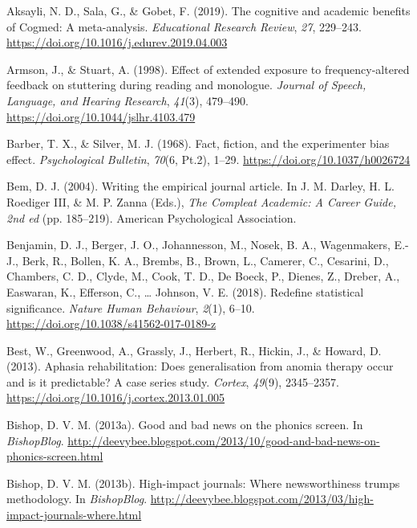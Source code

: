 \documentclass{krantz}
\newlength{\cslhangindent}
\newlength{\cslentryspacingunit} %
\newenvironment{CSLReferences}[2] %
{%
\setlength{\parindent}{0pt}
\ifodd #1
\let\oldpar\par
\def\par{\hangindent=\cslhangindent\oldpar}
\fi
\setlength{\parskip}{#2\cslentryspacingunit}
}%
{}
\begin{document}
\hypertarget{refs}{}
\begin{CSLReferences}{1}{0}
\leavevmode{}%
Aksayli, N. D., Sala, G., \& Gobet, F. (2019). The cognitive and academic benefits of {Cogmed}: {A} meta-analysis. \emph{Educational Research Review}, \emph{27}, 229--243. \url{https://doi.org/10.1016/j.edurev.2019.04.003}

\leavevmode{}%
Armson, J., \& Stuart, A. (1998). Effect of extended exposure to frequency-altered feedback on stuttering during reading and monologue. \emph{Journal of Speech, Language, and Hearing Research}, \emph{41}(3), 479--490. \url{https://doi.org/10.1044/jslhr.4103.479}

\leavevmode{}%
Barber, T. X., \& Silver, M. J. (1968). Fact, fiction, and the experimenter bias effect. \emph{Psychological Bulletin}, \emph{70}(6, Pt.2), 1--29. \url{https://doi.org/10.1037/h0026724}

\leavevmode{}%
Bem, D. J. (2004). Writing the empirical journal article. In J. M. Darley, H. L. Roediger III, \& M. P. Zanna (Eds.), \emph{The {Compleat Academic}: {A Career Guide}, 2nd ed} (pp. 185--219). {American Psychological Association}.

\leavevmode{}%
Benjamin, D. J., Berger, J. O., Johannesson, M., Nosek, B. A., Wagenmakers, E.-J., Berk, R., Bollen, K. A., Brembs, B., Brown, L., Camerer, C., Cesarini, D., Chambers, C. D., Clyde, M., Cook, T. D., De Boeck, P., Dienes, Z., Dreber, A., Easwaran, K., Efferson, C., \ldots{} Johnson, V. E. (2018). Redefine statistical significance. \emph{Nature Human Behaviour}, \emph{2}(1), 6--10. \url{https://doi.org/10.1038/s41562-017-0189-z}

\leavevmode{}%
Best, W., Greenwood, A., Grassly, J., Herbert, R., Hickin, J., \& Howard, D. (2013). Aphasia rehabilitation: {Does} generalisation from anomia therapy occur and is it predictable? {A} case series study. \emph{Cortex}, \emph{49}(9), 2345--2357. \url{https://doi.org/10.1016/j.cortex.2013.01.005}

\leavevmode{}%
Bishop, D. V. M. (2013a). Good and bad news on the phonics screen. In \emph{BishopBlog}. \url{http://deevybee.blogspot.com/2013/10/good-and-bad-news-on-phonics-screen.html}

\leavevmode{}%
Bishop, D. V. M. (2013b). High-impact journals: Where newsworthiness trumps methodology. In \emph{BishopBlog}. \url{http://deevybee.blogspot.com/2013/03/high-impact-journals-where.html}


\end{CSLReferences}
\end{document}
